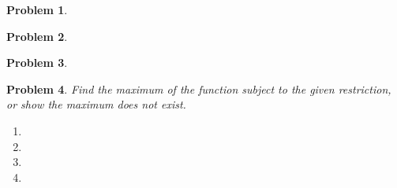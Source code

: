 \documentclass{article}
\newtheorem{problem}{Problem}
\renewcommand{\fcProblemRef}{\theproblem.\theenumi}
\begin{document}
\begin{problem}

\end{problem}

\begin{problem}

\end{problem}

\begin{problem}
 
\end{problem}

\begin{problem}Find the maximum of the function subject to the given restriction, or show the maximum does not exist. 
\begin{enumerate}[ref={\fcProblemRef}]
\item 
\item 
\item 
\item 

\end{enumerate}
\end{problem}

\end{document}
